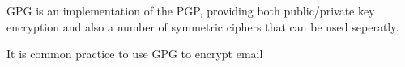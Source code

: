 GPG is an implementation of the PGP\cite{rfc4880}, providing both public/private
key encryption and also a number of symmetric ciphers that can be used
seperatly.

It is common practice to use GPG to encrypt email
